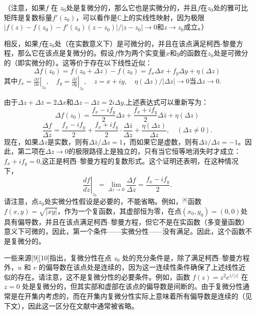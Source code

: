 （注意，如果\( f \) 在 \( z_0 \)处是复微分的，那么它也是实微分的，并且\( f \)在\( z_0 \)处的雅可比矩阵是复数标量\( f'(z_0) \)，可以看作是\( \mathbb{C} \)上的实线性映射，因为极限\(|f(z) - f(z_0) - f'(z_0)(z - z_0)|/|z - z_0| \to 0\)和\(z \to z_0\)成立。）

相反，如果\( f \)在\( z_0 \)处（在实数意义下）是可微分的，并且在该点满足柯西-黎曼方程，那么它在该点是复微分的。假设\( f \)作为两个实变量\( x \)和\( y \)的函数在\( z_0 \)处是可微分的（即实微分的）。这等价于存在以下线性近似：
\[
\Delta f(z_0) = f(z_0 + \Delta z) - f(z_0) = f_x \Delta x + f_y \Delta y + \eta(\Delta z)~
\]
其中\(f_x = \left. \frac{\partial f}{\partial x} \right|_{z_0}, \quad f_y = \left. \frac{\partial f}{\partial y} \right|_{z_0}, \quad z = x + iy, \quad \eta(\Delta z) / |\Delta z| \to 0\)当\(\Delta z \to 0\).

由于\(\Delta z + \Delta \bar{z} = 2 \Delta x \)和\(\Delta z - \Delta \bar{z} = 2i \Delta y\),上述表达式可以重新写为：
\[
\Delta f(z_0) = \frac{f_x - i f_y}{2} \Delta z + \frac{f_x + i f_y}{2} \Delta \bar{z} + \eta(\Delta z)~
\]
\[
\frac{\Delta f}{\Delta z} = \frac{f_x - i f_y}{2} + \frac{f_x + i f_y}{2} \cdot \frac{\Delta \bar{z}}{\Delta z} + \frac{\eta(\Delta z)}{\Delta z}, \quad (\Delta z \neq 0).~
\]
现在，如果\( \Delta z \)是实数，则有\(\Delta \bar{z}/\Delta z=1\)，而如果它是虚数，则有\(\Delta \bar{z}/\Delta z=-1\)。因此，第二项在\( \Delta z \to 0 \)的极限路径上是独立的，只有当它恒等地消失时才成立：\(f_x + i f_y = 0\),这正是柯西–黎曼方程的复数形式。这个证明还表明，在这种情况下，
\[
\left. \frac{df}{dz} \right|_{z_0} = \lim_{\Delta z \to 0} \frac{\Delta f}{\Delta z} = \frac{f_x - i f_y}{2}.~
\]
请注意，点\( z_0 \)处实微分性假设是必要的，不能省略。例如，\(^\text{[8]}\)函数\(f(x, y)=\sqrt{|xy|}\)，作为一个复函数，其虚部恒为零，在点\((x_0, y_0) = (0, 0)\)处具有偏导数，并且在该点满足柯西–黎曼方程，但它不是在实函数（多变量函数）意义下可微的，因此，第一个条件——实微分性——没有满足。因此，这个函数不是复微分的。

一些来源[9][10]指出，复微分性在点 \( z_0 \) 处的充分条件是，除了满足柯西–黎曼方程外，\( u \) 和 \( v \) 的偏导数在该点处是连续的，因为这一连续性条件确保了上述线性近似的存在。请注意，这不是复微分性的必要条件。例如，函数 \( f(z) = z^2 e^{i/|z|} \) 在 \( z = 0 \) 处是复微分的，但其实部和虚部在该点的偏导数是间断的。由于复微分性通常是在开集内考虑的，而在开集内复微分性实际上意味着所有偏导数是连续的（见下文），因此这一区分在文献中通常被省略。